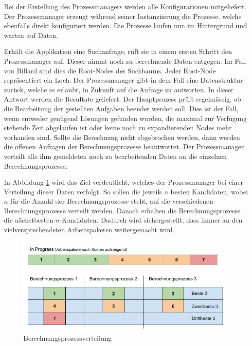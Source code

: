 Bei der Erstellung des Prozessmanagers werden alle Konfigurationen mitgeliefert. Der Prozessmanager erzeugt während seiner
Instanziierung die Prozesse, welche ebenfalls direkt konfiguriert werden. Die Prozesse laufen nun im Hintergrund und
warten auf Daten.

Erhält die Applikation eine Suchanfrage, ruft sie in einem ersten Schritt den Prozessmanager auf.
Dieser nimmt noch zu berechnende Daten entgegen. Im Fall von Billard sind dies die Root-Nodes des Suchbaums.
Jeder Root-Node repräsentiert ein Loch. Der Prozessmanager gibt in dem Fall eine Datenstruktur zurück, welche es erlaubt,
in Zukunft auf die Anfrage zu antworten. In dieser Antwort werden die Resultate geliefert.
Der Hauptprozess prüft regelmässig, ob die Bearbeitung der gestellten Aufgaben beendet werden soll.
Dies ist der Fall, wenn entweder genügend Lösungen gefunden wurden, die maximal zur Verfügung stehende Zeit abgelaufen ist
oder keine noch zu expandierenden Nodes mehr vorhanden sind.
Sollte die Berechnung nicht abgebrochen werden, dann werden die offenen Anfragen der Berechnungsprozesse beantwortet.
Der Prozessmanager verteilt alle ihm gemeldeten noch zu bearbeitenden Daten an die einzelnen Berechnungsprozesse.

In Abbildung \ref{fig:berechnungsprozess_verteilung} wird das Ziel verdeutlicht, welches der Prozessmanager bei einer
Verteilung dieser Daten verfolgt. So sollen die jeweils $n$ besten Kandidaten, wobei $n$ für die Anzahl der Berechnungsprozesse
steht, auf die verschiedenen Berechnungsprozesse verteilt werden. Danach erhalten die Berechnungsprozesse die nächstbesten
$n$-Kandidaten. Dadurch wird sichergestellt, dass immer an den vielversprechendsten Arbeitspaketen weitergemacht wird.

\begin{figure}[h!]
    \begin{center}
        \includegraphics[width=0.8\linewidth]{../common/03_billiard_ai/resources/20_berechnungsprozess_verteilung.png}
    \end{center}
    \caption{Berechnungsprozessverteilung}
    \label{fig:berechnungsprozess_verteilung}
\end{figure}

